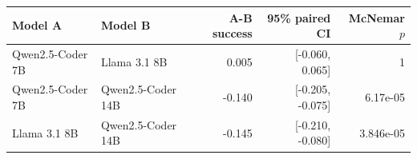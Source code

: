 \begin{tabular}{llrrr}
\toprule
Model A & Model B & A-B success & 95\% paired CI & McNemar $p$ \\
\midrule
Qwen2.5-Coder 7B & Llama 3.1 8B & 0.005 & [-0.060, 0.065] & 1 \\
Qwen2.5-Coder 7B & Qwen2.5-Coder 14B & -0.140 & [-0.205, -0.075] & 6.17e-05 \\
Llama 3.1 8B & Qwen2.5-Coder 14B & -0.145 & [-0.210, -0.080] & 3.846e-05 \\
\bottomrule
\end{tabular}
